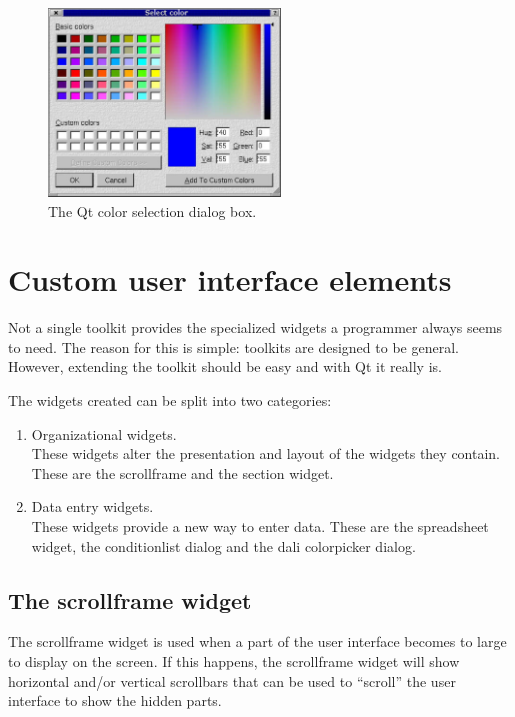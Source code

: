 \begin{figure}[hb] \begin{center}
\includegraphics[height=5cm]{./figures/color.eps}
\caption{The Qt color selection dialog box.}
\label{fig:uidesign:colordialog}
\end{center} \end{figure}

\section{Custom user interface elements} \label{sect:uidesign:custom}
Not a single toolkit provides the specialized widgets a programmer always seems
to need. The reason for this is simple: toolkits are designed to be general.
However, extending the toolkit should be easy and with Qt it really is.

The widgets created can be split into two categories:
\begin{enumerate}
\item Organizational widgets.\\ These widgets alter the presentation and layout of the widgets
they contain. These are the scrollframe and the section widget.
\item Data entry widgets.\\ These widgets provide a new way to enter data.
These are the spreadsheet widget, the conditionlist dialog and the dali
colorpicker dialog.
\end{enumerate}

\subsection{The scrollframe widget}
The scrollframe widget is used when a part of the user interface becomes to
large to display on the screen. If this happens, the scrollframe widget will
show horizontal and/or vertical scrollbars that can be used to ``scroll'' the
user interface to show the hidden parts.

